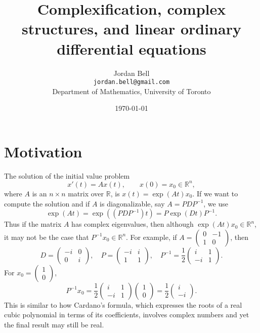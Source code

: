 \documentclass{article}
\begin{document}
\title{Complexification, complex structures, and linear ordinary differential equations}
\author{Jordan Bell\\ \texttt{jordan.bell@gmail.com}\\Department of Mathematics, University of Toronto}
\date{\today}
\maketitle

\section{Motivation}
The solution of the initial value problem 
\[
x'(t)=Ax(t), \qquad x(0)=x_0 \in \mathbb{R}^n,
\]
where $A$ is an $n \times n$ matrix over $\mathbb{R}$,
is $x(t)=\exp(At)x_0$. If we want to compute the solution and if $A$ is diagonalizable, say $A=PDP^{-1}$, we use
\[
\exp(At)=\exp((PDP^{-1})t)=P\exp(Dt)P^{-1}.
\]
Thus if the matrix $A$ has complex eigenvalues, then although $\exp(At)x_0 \in \mathbb{R}^n$, it may not be the case that $P^{-1}x_0 \in \mathbb{R}^n$. 
For example, if $A=\begin{pmatrix}0&-1\\1&0\end{pmatrix}$, then
\[
D=\begin{pmatrix}-i&0\\0&i\end{pmatrix}, \quad
P=\begin{pmatrix}-i&i\\1&1\end{pmatrix}, \quad
P^{-1}=\frac{1}{2}\begin{pmatrix}i&1\\-i&1\end{pmatrix}.
\]
For $x_0=\begin{pmatrix}1\\0\end{pmatrix}$, 
\[
P^{-1}x_0=\frac{1}{2}\begin{pmatrix}i&1\\-i&1\end{pmatrix} \begin{pmatrix}1\\0\end{pmatrix}
=\frac{1}{2} \begin{pmatrix}i\\-i\end{pmatrix}.
\]
This is similar to how Cardano's formula, which expresses the roots of a real cubic polynomial in terms of its coefficients,
involves complex numbers and yet the final result may still be real.
\end{document}
